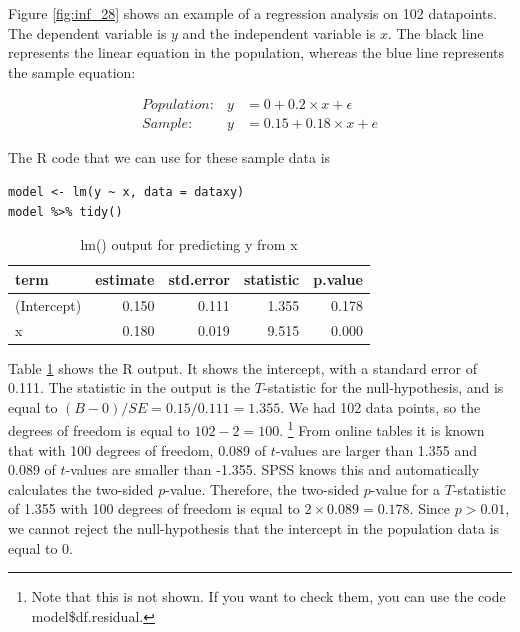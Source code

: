 \documentclass[]{book}\usepackage[]{graphicx}\usepackage[]{color}
\begin{document}
Figure \ref{fig:inf_28} shows an example of a regression analysis on 102 datapoints. The dependent variable is $y$ and the independent variable is $x$. The black line represents the linear equation in the population, whereas the blue line represents the sample equation:



\begin{eqnarray}
Population: &y&= 0 + 0.2 \times x + \epsilon\\
Sample: &y&= 0.15 + 0.18\times x + e
\end{eqnarray}

The R code that we can use for these sample data is

\begin{lstlisting}
model <- lm(y ~ x, data = dataxy)
model %>% tidy()
\end{lstlisting}


\begin{table}[ht]
\centering
\caption{lm() output for predicting y from x} 
\label{tab:out_xy_r}
\begin{tabular}{lrrrr}
  \hline
term & estimate & std.error & statistic & p.value \\ 
  \hline
(Intercept) & 0.150 & 0.111 & 1.355 & 0.178 \\ 
  x & 0.180 & 0.019 & 9.515 & 0.000 \\ 
   \hline
\end{tabular}
\end{table}



Table \ref{tab:out_xy_r} shows the R output. It shows the intercept, with a standard error of 0.111. The statistic in the output is the $T$-statistic for the null-hypothesis, and is equal to $(B-0)/SE=0.15/0.111=1.355$. We had 102 data points, so the degrees of freedom is equal to $102-2=100$. \footnote{Note that this is not shown. If you want to check them, you can use the code model\$df.residual.} From online tables it is known that with 100 degrees of freedom, 0.089 of $t$-values are larger than 1.355 and 0.089 of $t$-values are smaller than -1.355. SPSS knows this and automatically calculates the two-sided $p$-value. Therefore, the two-sided $p$-value for a $T$-statistic of 1.355 with 100 degrees of freedom is equal to $2 \times 0.089 = 0.178$. Since $p > 0.01$, we cannot reject the null-hypothesis that the intercept in the population data is equal to 0. 
\end{document}
